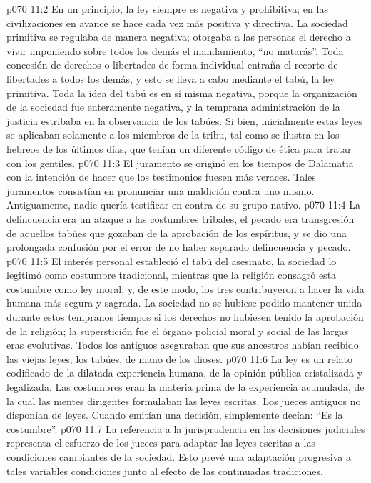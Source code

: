 \vs p070 11:2 En un principio, la ley siempre es negativa y prohibitiva; en las civilizaciones en avance se hace cada vez más positiva y directiva. La sociedad primitiva se regulaba de manera negativa; otorgaba a las personas el derecho a vivir imponiendo sobre todos los demás el mandamiento, “no matarás”. Toda concesión de derechos o libertades de forma individual entraña el recorte de libertades a todos los demás, y esto se lleva a cabo mediante el tabú, la ley primitiva. Toda la idea del tabú es en sí misma negativa, porque la organización de la sociedad fue enteramente negativa, y la temprana administración de la justicia estribaba en la observancia de los tabúes. Si bien, inicialmente estas leyes se aplicaban solamente a los miembros de la tribu, tal como se ilustra en los hebreos de los últimos días, que tenían un diferente código de ética para tratar con los gentiles.
\vs p070 11:3 El juramento se originó en los tiempos de Dalamatia con la intención de hacer que los testimonios fuesen más veraces. Tales juramentos consistían en pronunciar una maldición contra uno mismo. Antiguamente, nadie quería testificar en contra de su grupo nativo.
\vs p070 11:4 \pc La delincuencia era un ataque a las costumbres tribales, el pecado era transgresión de aquellos tabúes que gozaban de la aprobación de los espíritus, y se dio una prolongada confusión por el error de no haber separado delincuencia y pecado.
\vs p070 11:5 El interés personal estableció el tabú del asesinato, la sociedad lo legitimó como costumbre tradicional, mientras que la religión consagró esta costumbre como ley moral; y, de este modo, los tres contribuyeron a hacer la vida humana más segura y sagrada. La sociedad no se hubiese podido mantener unida durante estos tempranos tiempos si los derechos no hubiesen tenido la aprobación de la religión; la superstición fue el órgano policial moral y social de las largas eras evolutivas. Todos los antiguos aseguraban que sus ancestros habían recibido las viejas leyes, los tabúes, de mano de los dioses.
\vs p070 11:6 La ley es un relato codificado de la dilatada experiencia humana, de la opinión pública cristalizada y legalizada. Las costumbres eran la materia prima de la experiencia acumulada, de la cual las mentes dirigentes formulaban las leyes escritas. Los jueces antiguos no disponían de leyes. Cuando emitían una decisión, simplemente decían: “Es la costumbre”.
\vs p070 11:7 La referencia a la jurisprudencia en las decisiones judiciales representa el esfuerzo de los jueces para adaptar las leyes escritas a las condiciones cambiantes de la sociedad. Esto prevé una adaptación progresiva a tales variables condiciones junto al efecto de las continuadas tradiciones.
